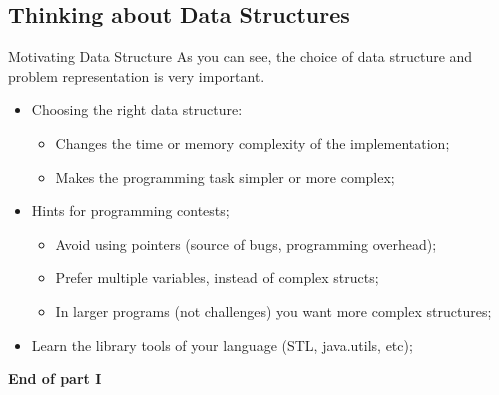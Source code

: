 \subsection{Thinking about Data Structures}
\begin{frame}{Motivating Data Structure}
  As you can see, the choice of data structure and problem representation is very important.\bigskip

  \begin{itemize}
    \item Choosing the right data structure:
    \begin{itemize}
      \item Changes the time or memory complexity of the implementation;
      \item Makes the programming task simpler or more complex;
    \end{itemize}\medskip

    \item Hints for programming contests;
    \begin{itemize}
      \item Avoid using pointers (source of bugs, programming overhead);
      \item Prefer multiple variables, instead of complex structs;
      \item In larger programs (not challenges) you want more complex structures;
    \end{itemize}\medskip

    \item Learn the library tools of your language (STL, java.utils, etc);
  \end{itemize}\bigskip

  \hfill {\bf End of part I}
\end{frame}
